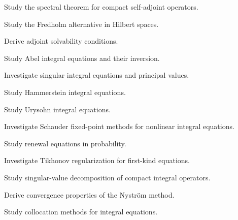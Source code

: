 \begin{exercise}[4]
Study the spectral theorem for compact self-adjoint operators.
\end{exercise}

\begin{exercise}[4]
Study the Fredholm alternative in Hilbert spaces.
\end{exercise}

\begin{exercise}[4]
Derive adjoint solvability conditions.
\end{exercise}

\begin{exercise}[4]
Study Abel integral equations and their inversion.
\end{exercise}

\begin{exercise}[4]
Investigate singular integral equations and principal values.
\end{exercise}

\begin{exercise}[4]
Study Hammerstein integral equations.
\end{exercise}

\begin{exercise}[4]
Study Urysohn integral equations.
\end{exercise}

\begin{exercise}[4]
Investigate Schauder fixed-point methods for nonlinear integral
equations.
\end{exercise}

\begin{exercise}[4]
Study renewal equations in probability.
\end{exercise}

\begin{exercise}[4]
Investigate Tikhonov regularization for first-kind equations.
\end{exercise}

\begin{exercise}[4]
Study singular-value decomposition of compact integral operators.
\end{exercise}

\begin{exercise}[4]
Derive convergence properties of the Nystr\"om method.
\end{exercise}

\begin{exercise}[4]
Study collocation methods for integral equations.
\end{exercise}

